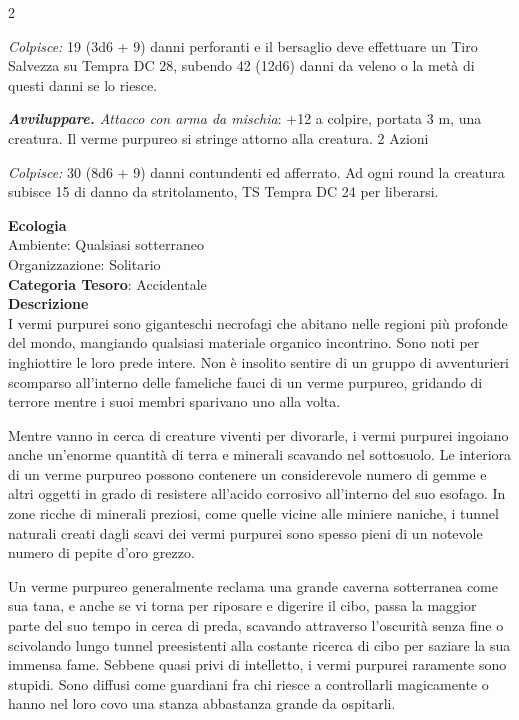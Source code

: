 \begin{multicols}{2}
{\emph{Colpisce:} 19 (3d6 + 9) danni perforanti e il bersaglio deve effettuare un Tiro Salvezza su Tempra DC 28, subendo 42 (12d6) danni da veleno o la metà di questi danni se lo riesce.

\emph{\textbf{Avviluppare.} Attacco con arma da mischia}: +12 a colpire, portata 3 m, una creatura. Il verme purpureo si stringe attorno alla creatura. 2 Azioni

\emph{Colpisce:} 30 (8d6 + 9) danni contundenti ed afferrato. Ad ogni round la creatura subisce 15 di danno da stritolamento, TS Tempra DC 24 per liberarsi.

\textbf{Ecologia}\\
Ambiente: Qualsiasi sotterraneo\\
Organizzazione: Solitario\\
\textbf{Categoria Tesoro}: Accidentale\\
\textbf{Descrizione}\\
I vermi purpurei sono giganteschi necrofagi che abitano nelle regioni più profonde del mondo, mangiando qualsiasi materiale organico incontrino. Sono noti per inghiottire le loro prede intere. Non è insolito sentire di un gruppo di avventurieri scomparso all'interno delle fameliche fauci di un verme purpureo, gridando di terrore mentre i suoi membri sparivano uno alla volta.

Mentre vanno in cerca di creature viventi per divorarle, i vermi purpurei ingoiano anche un'enorme quantità di terra e minerali scavando nel sottosuolo. Le interiora di un verme purpureo possono contenere un considerevole numero di gemme e altri oggetti in grado di resistere all'acido corrosivo all'interno del suo esofago. In zone ricche di minerali preziosi, come quelle vicine alle miniere naniche, i tunnel naturali creati dagli scavi dei vermi purpurei sono spesso pieni di un notevole numero di pepite d'oro grezzo.

Un verme purpureo generalmente reclama una grande caverna sotterranea come sua tana, e anche se vi torna per riposare e digerire il cibo, passa la maggior parte del suo tempo in cerca di preda, scavando attraverso l'oscurità senza fine o scivolando lungo tunnel preesistenti alla costante ricerca di cibo per saziare la sua immensa fame. Sebbene quasi privi di intelletto, i vermi purpurei raramente sono stupidi. Sono diffusi come guardiani fra chi riesce a controllarli magicamente o hanno nel loro covo una stanza abbastanza grande da ospitarli.

}
\end{multicols}
